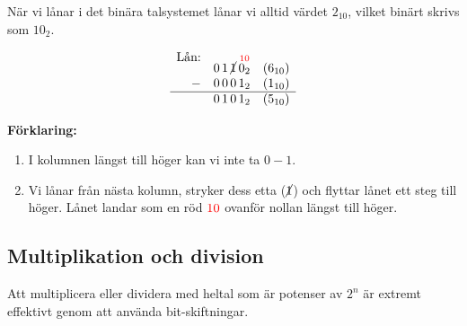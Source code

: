 \documentclass[
  swedish,
  letterpaper,
  oneside,
  openany]{book}
\providecommand{\tightlist}{%
  \setlength{\itemsep}{0pt}\setlength{\parskip}{0pt}}
\begin{document}
\begin{tcolorbox}[enhanced jigsaw, arc=.35mm, bottomrule=.15mm, bottomtitle=1mm, breakable, colback=white, colbacktitle=quarto-callout-note-color!10!white, colframe=quarto-callout-note-color-frame, coltitle=black, left=2mm, leftrule=.75mm, opacityback=0, opacitybacktitle=0.6, rightrule=.15mm, title=\textcolor{quarto-callout-note-color}{\faInfo}\hspace{0.5em}{Exempel: Binär subtraktion med lån (\(6_{10} - 1_{10}\))}, titlerule=0mm, toprule=.15mm, toptitle=1mm]

När vi lånar i det binära talsystemet lånar vi alltid värdet \(2_{10}\),
vilket binärt skrivs som \(10_2\).

\[
\begin{array}{r@{\quad}c@{\,}c@{\,}c@{\,}c@{\quad}l}
  \text{Lån:} & & & & \color{red}{\scriptstyle 10} & \\[-0.8ex]
  & 0 & 1 & \cancel{1} & 0_2 & (6_{10}) \\
- & 0 & 0 & 0 & 1_2 & (1_{10}) \\
\hline
  & 0 & 1 & 0 & 1_2 & (5_{10})
\end{array}
\]

\textbf{Förklaring:}

\begin{enumerate}
\def\labelenumi{\arabic{enumi}.}
\tightlist
\item
  I kolumnen längst till höger kan vi inte ta \(0-1\).
\item
  Vi lånar från nästa kolumn, stryker dess etta (\(\cancel{1}\)) och
  flyttar lånet ett steg till höger. Lånet landar som en röd
  \(\color{red}{10}\) ovanför nollan längst till höger.
\end{enumerate}

\end{tcolorbox}

\subsection{Multiplikation och
division}\label{multiplikation-och-division}

Att multiplicera eller dividera med heltal som är potenser av \(2^n\) är
extremt effektivt genom att använda bit-skiftningar.
\end{document}
